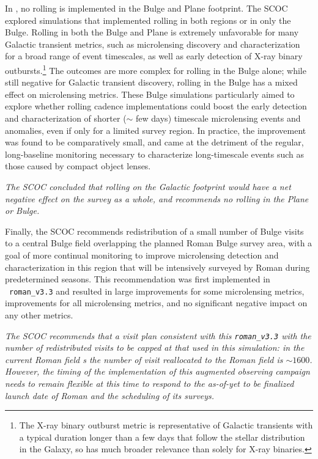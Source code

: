 In , no rolling is implemented in the Bulge and Plane footprint. The SCOC explored simulations that implemented rolling in both regions or in only the Bulge.
Rolling in both the Bulge and Plane is extremely unfavorable for many Galactic transient metrics, such as microlensing discovery and characterization for a broad range of event timescales, as well as early detection of X-ray binary outbursts.\footnote{The X-ray binary outburst metric is representative of Galactic transients with a typical duration longer than a few days that follow the stellar distribution in the Galaxy, so has much broader relevance than solely for X-ray binaries.} The outcomes are more complex for rolling in the Bulge alone; while still negative for Galactic transient discovery, rolling in the Bulge has a mixed effect on microlensing metrics. These Bulge simulations particularly aimed to explore whether rolling cadence implementations could boost the early detection and characterization of shorter ($\sim$ few days) timescale microlensing events and anomalies, even if only for a limited survey region. In practice, the improvement was found to be comparatively small, and came at the detriment of the regular, long-baseline monitoring necessary to characterize long-timescale events such as those caused by compact object lenses.   


{\it The SCOC concluded that rolling on the Galactic footprint would have a net negative effect on the survey as a whole, and recommends no rolling in the Plane or Bulge.}

Finally, the SCOC recommends redistribution of a small number of Bulge visits to 
a central Bulge field overlapping the planned Roman Bulge survey area, with a goal of more continual monitoring to improve microlensing detection and characterization in this region that will be intensively surveyed by Roman during predetermined seasons.
This recommendation was first implemented in \opsim\ \texttt{roman\_v3.3} and resulted in large improvements for some microlensing metrics, improvements for all microlensing metrics, and no significant negative impact on any other metrics. 

{\it The SCOC recommends that a visit plan consistent with this \texttt{roman\_v3.3} with the number of redistributed visits to be capped at that used in this simulation: in the current Roman field \opsim s the number of visit reallocated to the Roman field is $\sim1600$. However, the timing of the implementation of this augmented observing campaign needs to remain flexible at this time to respond to the as-of-yet to be finalized launch date of Roman and the scheduling of its surveys.}


